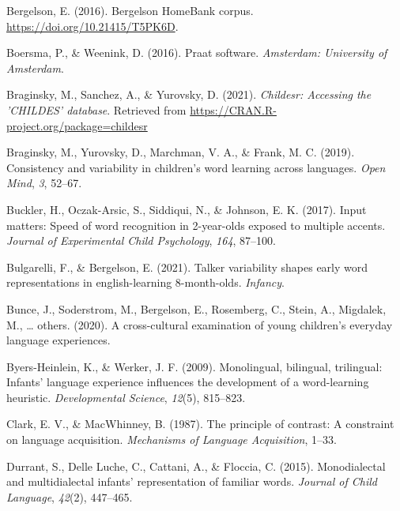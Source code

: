 \documentclass[10pt, letterpaper]{article}
\newenvironment{CSLReferences}%
  {}%
  {\par}
\begin{document}
\hypertarget{refs}{}
\begin{CSLReferences}{1}{0}
\leavevmode\hypertarget{ref-bergelsoncorpus}{}%
Bergelson, E. (2016). Bergelson HomeBank corpus.
\url{https://doi.org/10.21415/T5PK6D}.

\leavevmode\hypertarget{ref-boersma2016praat}{}%
Boersma, P., \& Weenink, D. (2016). Praat software. \emph{Amsterdam:
University of Amsterdam}.

\leavevmode\hypertarget{ref-braginsky2021childesr}{}%
Braginsky, M., Sanchez, A., \& Yurovsky, D. (2021). \emph{Childesr:
Accessing the 'CHILDES' database}. Retrieved from
\url{https://CRAN.R-project.org/package=childesr}

\leavevmode\hypertarget{ref-braginsky2019consistency}{}%
Braginsky, M., Yurovsky, D., Marchman, V. A., \& Frank, M. C. (2019).
Consistency and variability in children's word learning across
languages. \emph{Open Mind}, \emph{3}, 52--67.

\leavevmode\hypertarget{ref-buckler2017input}{}%
Buckler, H., Oczak-Arsic, S., Siddiqui, N., \& Johnson, E. K. (2017).
Input matters: Speed of word recognition in 2-year-olds exposed to
multiple accents. \emph{Journal of Experimental Child Psychology},
\emph{164}, 87--100.

\leavevmode\hypertarget{ref-bulgarelli2021talker}{}%
Bulgarelli, F., \& Bergelson, E. (2021). Talker variability shapes early
word representations in english-learning 8-month-olds. \emph{Infancy}.

\leavevmode\hypertarget{ref-bunceURcross}{}%
Bunce, J., Soderstrom, M., Bergelson, E., Rosemberg, C., Stein, A.,
Migdalek, M., \ldots{} others. (2020). A cross-cultural examination of
young children's everyday language experiences.

\leavevmode\hypertarget{ref-byers2009monolingual}{}%
Byers-Heinlein, K., \& Werker, J. F. (2009). Monolingual, bilingual,
trilingual: Infants' language experience influences the development of a
word-learning heuristic. \emph{Developmental Science}, \emph{12}(5),
815--823.

\leavevmode\hypertarget{ref-clark1987principle}{}%
Clark, E. V., \& MacWhinney, B. (1987). The principle of contrast: A
constraint on language acquisition. \emph{Mechanisms of Language
Acquisition}, 1--33.

\leavevmode\hypertarget{ref-durrant2015monodialectal}{}%
Durrant, S., Delle Luche, C., Cattani, A., \& Floccia, C. (2015).
Monodialectal and multidialectal infants' representation of familiar
words. \emph{Journal of Child Language}, \emph{42}(2), 447--465.


\end{CSLReferences}
\end{document}
